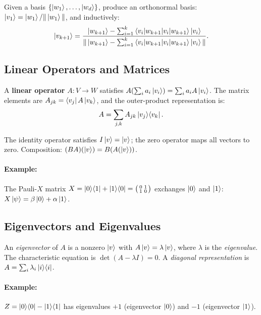 \documentclass[10pt,a4paper]{article}
\begin{document}
\begin{tcolorbox}[defstyle, title={Definition: Gram--Schmidt Procedure}]
Given a basis $\{\ket{w_1},\dots,\ket{w_d}\}$, produce an orthonormal basis: $\ket{v_1}=\ket{w_1}/\|\ket{w_1}\|$, and inductively:
\[
\ket{v_{k+1}} = \frac{\ket{w_{k+1}} - \sum_{i=1}^{k}\braket{v_i|w_{k+1}}\ket{v_i}}{\|\ket{w_{k+1}} - \sum_{i=1}^{k}\braket{v_i|w_{k+1}}\ket{v_i}\|}.
\]
\end{tcolorbox}

\subsection{Linear Operators and Matrices}

\begin{tcolorbox}[defstyle, title={Definition: Linear Operator}]
A \textbf{linear operator} $A:V\to W$ satisfies $A(\sum_i a_i\ket{v_i})=\sum_i a_i A\ket{v_i}$. The matrix elements are $A_{jk}=\bra{v_j}A\ket{v_k}$, and the outer-product representation is:
\[
A = \sum_{j,k} A_{jk}\ket{v_j}\!\bra{v_k}.
\]
\end{tcolorbox}

The identity operator satisfies $I\ket{v}=\ket{v}$; the zero operator maps all vectors to zero. Composition: $(BA)(\ket{v})=B(A(\ket{v}))$.

\paragraph{Example:} The Pauli-$X$ matrix $X=\ket{0}\!\bra{1}+\ket{1}\!\bra{0}=\bigl(\begin{smallmatrix}0&1\\1&0\end{smallmatrix}\bigr)$ exchanges $\ket{0}$ and $\ket{1}$: $X\ket{\psi}=\beta\ket{0}+\alpha\ket{1}$.

\subsection{Eigenvectors and Eigenvalues}

An \emph{eigenvector} of $A$ is a nonzero $\ket{v}$ with $A\ket{v}=\lambda\ket{v}$, where $\lambda$ is the \emph{eigenvalue}. The characteristic equation is $\det(A-\lambda I)=0$. A \emph{diagonal representation} is $A=\sum_i\lambda_i\ket{i}\!\bra{i}$.

\paragraph{Example:} $Z=\ket{0}\!\bra{0}-\ket{1}\!\bra{1}$ has eigenvalues $+1$ (eigenvector $\ket{0}$) and $-1$ (eigenvector $\ket{1}$).
\end{document}

